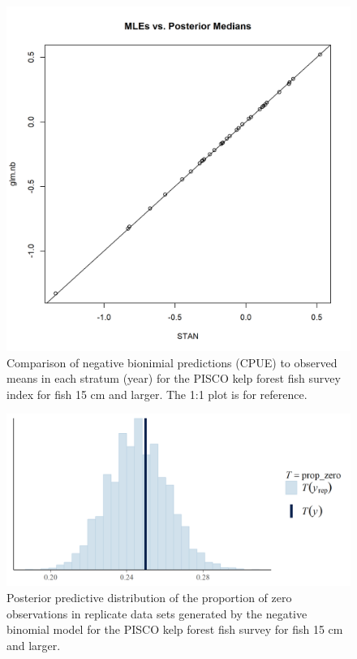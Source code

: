 \documentclass[12pt,]{article}
\begin{document}
\FloatBarrier

\begin{figure}
\centering
\includegraphics{Figures/Fleet8large_MLE_stan.png}
\caption{Comparison of negative bionimial predictions (CPUE) to observed
means in each stratum (year) for the PISCO kelp forest fish survey index
for fish 15 cm and larger. The 1:1 plot is for reference.
\label{fig:Fleet8large_MLE_stan}}
\end{figure}

\FloatBarrier

\begin{figure}
\centering
\includegraphics{Figures/Fleet8large_prop_zero_STAN.png}
\caption{Posterior predictive distribution of the proportion of zero
observations in replicate data sets generated by the negative binomial
model for the PISCO kelp forest fish survey for fish 15 cm and larger.
\label{fig:Fleet8large_prop_zero_STAN}}
\end{figure}
\end{document}
